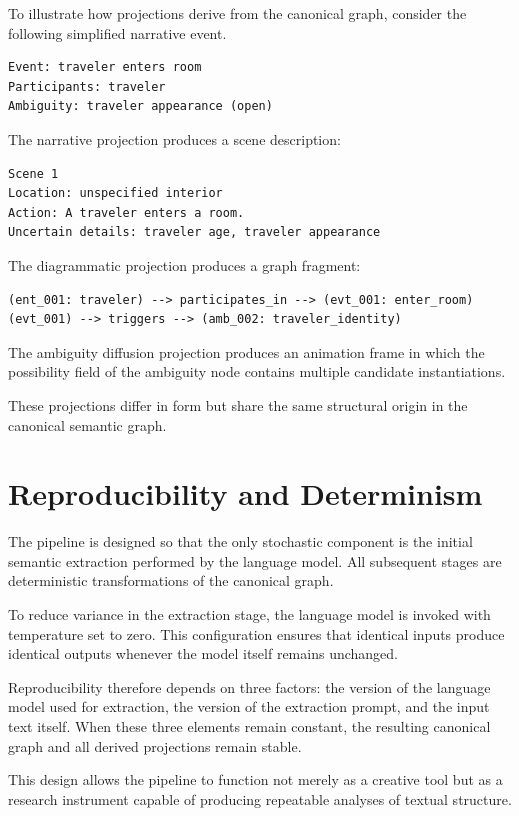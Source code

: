 \documentclass[12pt, a4paper]{article}
\begin{document}
To illustrate how projections derive from the canonical graph, consider the following simplified narrative event.

\begin{verbatim}
Event: traveler enters room
Participants: traveler
Ambiguity: traveler appearance (open)
\end{verbatim}

The narrative projection produces a scene description:

\begin{verbatim}
Scene 1
Location: unspecified interior
Action: A traveler enters a room.
Uncertain details: traveler age, traveler appearance
\end{verbatim}

The diagrammatic projection produces a graph fragment:

\begin{verbatim}
(ent_001: traveler) --> participates_in --> (evt_001: enter_room)
(evt_001) --> triggers --> (amb_002: traveler_identity)
\end{verbatim}

The ambiguity diffusion projection produces an animation frame in which the possibility field of the ambiguity node contains multiple candidate instantiations.

These projections differ in form but share the same structural origin in the canonical semantic graph.

\section{Reproducibility and Determinism}

The pipeline is designed so that the only stochastic component is the initial semantic extraction performed by the language model. All subsequent stages are deterministic transformations of the canonical graph.

To reduce variance in the extraction stage, the language model is invoked with temperature set to zero. This configuration ensures that identical inputs produce identical outputs whenever the model itself remains unchanged.

Reproducibility therefore depends on three factors: the version of the language model used for extraction, the version of the extraction prompt, and the input text itself. When these three elements remain constant, the resulting canonical graph and all derived projections remain stable.

This design allows the pipeline to function not merely as a creative tool but as a research instrument capable of producing repeatable analyses of textual structure.
\end{document}
